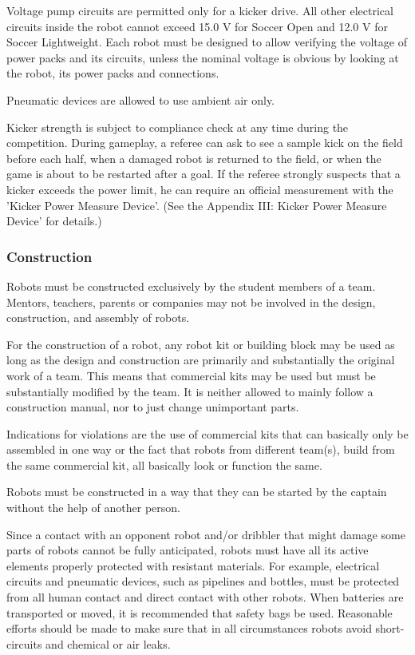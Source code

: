 \documentclass{article}
\begin{document}
Voltage pump circuits are permitted only for a kicker drive. All other electrical circuits inside the robot cannot exceed 15.0 V for Soccer Open and 12.0 V for Soccer Lightweight. Each robot must be designed to allow verifying the voltage of power packs and its circuits, unless the nominal voltage is obvious by looking at the robot, its power packs and connections.

Pneumatic devices are allowed to use ambient air only.

Kicker strength is subject to compliance check at any time during the competition. During gameplay, a referee can ask to see a sample kick on the field before each half, when a damaged robot is returned to the field, or when the game is about to be restarted after a goal. If the referee strongly suspects that a kicker exceeds the power limit, he can require an official measurement with the 'Kicker Power Measure Device'. (See the Appendix III: Kicker Power Measure Device' for details.)

\subsubsection{Construction \label{ref-057}}

Robots must be constructed exclusively by the student members of a team. Mentors, teachers, parents or companies may not be involved in the design, construction, and assembly of robots.

For the construction of a robot, any robot kit or building block may be used as long as the design and construction are primarily and substantially the original work of a team. This means that commercial kits may be used but must be substantially modified by the team. It is neither allowed to mainly follow a construction manual, nor to just change unimportant parts.

Indications for violations are the use of commercial kits that can basically only be assembled in one way or the fact that robots from different team(s), build from the same commercial kit, all basically look or function the same.

Robots must be constructed in a way that they can be started by the captain without the help of another person.

Since a contact with an opponent robot and/or dribbler that might damage some parts of robots cannot be fully anticipated, robots must have all its active elements properly protected with resistant materials. For example, electrical circuits and pneumatic devices, such as pipelines and bottles, must be protected from all human contact and direct contact with other robots. When batteries are transported or moved, it is recommended that safety bags be used. Reasonable efforts should be made to make sure that in all circumstances robots avoid short-circuits and chemical or air leaks.
\end{document}
